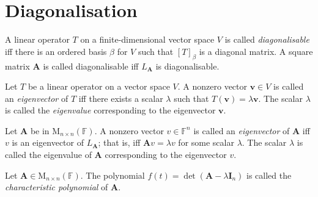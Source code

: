 \documentclass[../Notes.tex]{subfiles}
\begin{document}
\section{Diagonalisation}
\begin{definition}{}{}
    A linear operator \(T\) on a finite-dimensional vector space \(V\) is called \emph{diagonalisable} iff there is an ordered basis \(\beta\) for \(V\) such that \([T]_\beta\) is a diagonal matrix. A square matrix \(\mathbf{A}\) is called diagonalisable iff \(L_\mathbf{A}\) is diagonalisable.
\end{definition}
\begin{definition}{}{}
    Let \(T\) be a linear operator on a vector space \(V\). A nonzero vector \(\mathbf{v}\in V\) is called an \emph{eigenvector} of \(T\) iff there exists a scalar \(\lambda\) such that \(T(\mathbf{v})=\lambda \mathbf{v}\). The scalar \(\lambda\) is called the \emph{eigenvalue} corresponding to the eigenvector \(\mathbf{v}\).

    Let \(\mathbf{A}\) be in \(\mathrm{M}_{n\times n}(\mathbb{F})\). A nonzero vector \(v\in \mathbb{F}^n\) is called an \emph{eigenvector} of \(\mathbf{A}\) iff \(v\) is an eigenvector of \(L_\mathbf{A}\); that is, iff \(\mathbf{A}v=\lambda v\) for some scalar \(\lambda\). The scalar \(\lambda\) is called the eigenvalue of \(\mathbf{A}\) corresponding to the eigenvector \(v\).
\end{definition}
\begin{definition}{}{}
    Let \(\mathbf{A}\in \mathrm{M}_{n\times n}(\mathbb{F})\). The polynomial \(f(t)=\det(\mathbf{A}-\lambda \mathbf{I}_n)\) is called the \emph{characteristic polynomial} of \(\mathbf{A}\).
\end{definition}
\end{document}
